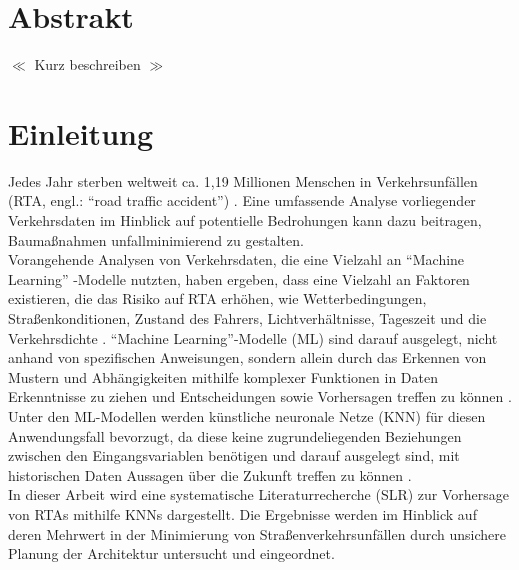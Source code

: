 \documentclass{scrartcl}
\begin{document}

\newpage
\onehalfspacing

\section*{Abstrakt}
$\ll$ Kurz beschreiben $\gg$

\newpage
\tableofcontents
\newpage

\section{Einleitung}

Jedes Jahr sterben weltweit ca. 1,19 Millionen Menschen in Verkehrsunfällen
(RTA, engl.: \enquote{road traffic accident}) \cite{who}.
Eine umfassende Analyse vorliegender Verkehrsdaten im Hinblick auf potentielle
Bedrohungen kann dazu beitragen, Baumaßnahmen unfallminimierend zu gestalten.
\medskip \\
Vorangehende Analysen von Verkehrsdaten, die eine Vielzahl an \enquote{Machine Learning}
-Modelle nutzten, haben ergeben, dass eine Vielzahl an Faktoren existieren,
die das Risiko auf RTA erhöhen, wie Wetterbedingungen, Straßenkonditionen,
Zustand des Fahrers, Lichtverhältnisse, Tageszeit und die Verkehrsdichte \cite{ml, predict}.
\enquote{Machine Learning}-Modelle (ML) sind darauf ausgelegt, nicht anhand von
spezifischen Anweisungen, sondern allein durch das Erkennen von Mustern und
Abhängigkeiten mithilfe komplexer Funktionen \cite{predict} in Daten Erkenntnisse
zu ziehen und Entscheidungen sowie Vorhersagen treffen zu können \cite{sap}.
\medskip \\
Unter den ML-Modellen werden künstliche neuronale Netze (KNN) für diesen
Anwendungsfall bevorzugt, da diese keine zugrundeliegenden Beziehungen
zwischen den Eingangsvariablen benötigen und darauf ausgelegt sind,
mit historischen Daten Aussagen über die Zukunft treffen zu können
\cite{predict}.
\medskip \\
In dieser Arbeit wird eine systematische Literaturrecherche (SLR) zur Vorhersage
von RTAs mithilfe KNNs dargestellt. Die Ergebnisse werden im Hinblick auf deren
Mehrwert in der Minimierung von Straßenverkehrsunfällen durch unsichere
Planung der Architektur untersucht und eingeordnet.
\end{document}
